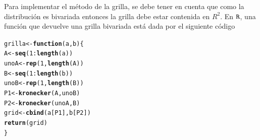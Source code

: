 \documentclass[10pt,openright]{book}\usepackage[]{graphicx}\usepackage[]{color}
\makeatletter
\newcommand{\hlnum}[1]{\textcolor[rgb]{0.686,0.059,0.569}{#1}}%
\newcommand{\hlopt}[1]{\textcolor[rgb]{0,0,0}{#1}}%
\newcommand{\hlstd}[1]{\textcolor[rgb]{0.345,0.345,0.345}{#1}}%
\newcommand{\hlkwa}[1]{\textcolor[rgb]{0.161,0.373,0.58}{\textbf{#1}}}%
\newcommand{\hlkwb}[1]{\textcolor[rgb]{0.69,0.353,0.396}{#1}}%
\newcommand{\hlkwc}[1]{\textcolor[rgb]{0.333,0.667,0.333}{#1}}%
\newcommand{\hlkwd}[1]{\textcolor[rgb]{0.737,0.353,0.396}{\textbf{#1}}}%
\newenvironment{kframe}{%
 \def\at@end@of@kframe{}%
 \ifinner\ifhmode%
  \def\at@end@of@kframe{\end{minipage}}%
  \begin{minipage}{\columnwidth}%
 \fi\fi%
 \def\FrameCommand##1{\hskip\@totalleftmargin \hskip-\fboxsep
 \colorbox{shadecolor}{##1}\hskip-\fboxsep
     \hskip-\linewidth \hskip-\@totalleftmargin \hskip\columnwidth}%
 \MakeFramed {\advance\hsize-\width
   \@totalleftmargin\z@ \linewidth\hsize
   \@setminipage}}%
 {\par\unskip\endMakeFramed%
 \at@end@of@kframe}
\newenvironment{knitrout}{}{} %
\makeatother
\begin{document}
Para implementar el m\'etodo de la grilla, se debe tener en cuenta que como la distribuci\'on es bivariada entonces la grilla debe estar contenida en $R^2$. En $\verb'R'$, una funci\'on que devuelve una grilla bivariada est\'a dada por el siguiente c\'odigo
\begin{knitrout}
\color{fgcolor}\begin{kframe}
\begin{alltt}
 \hlstd{grilla}\hlkwb{<-}\hlkwa{function}\hlstd{(}\hlkwc{a}\hlstd{,}\hlkwc{b}\hlstd{)\{}
   \hlstd{A}\hlkwb{<-}\hlkwd{seq}\hlstd{(}\hlnum{1}\hlopt{:}\hlkwd{length}\hlstd{(a))}
   \hlstd{unoA} \hlkwb{<-}\hlkwd{rep}\hlstd{(}\hlnum{1}\hlstd{,}\hlkwd{length}\hlstd{(A))}
   \hlstd{B}\hlkwb{<-}\hlkwd{seq}\hlstd{(}\hlnum{1}\hlopt{:}\hlkwd{length}\hlstd{(b))}
   \hlstd{unoB} \hlkwb{<-}\hlkwd{rep}\hlstd{(}\hlnum{1}\hlstd{,}\hlkwd{length}\hlstd{(B))}
   \hlstd{P1}\hlkwb{<-}\hlkwd{kronecker}\hlstd{(A,unoB)}
   \hlstd{P2}\hlkwb{<-}\hlkwd{kronecker}\hlstd{(unoA,B)}
   \hlstd{grid}\hlkwb{<-}\hlkwd{cbind}\hlstd{(a[P1],b[P2])}
   \hlkwd{return}\hlstd{(grid)}
 \hlstd{\}}
\end{alltt}
\end{kframe}
\end{knitrout}
\end{document}
